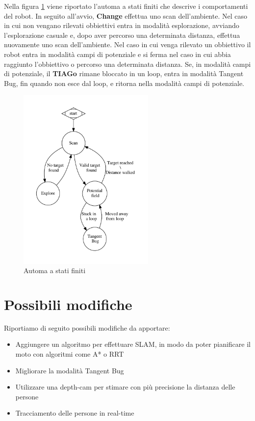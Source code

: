\documentclass[a4paper]{article}
\begin{document}
	Nella figura \ref{fig:fsa} viene riportato l'automa a stati finiti che
	descrive i comportamenti del robot. In seguito all'avvio, \textbf{Change}
	effettua uno scan dell'ambiente. Nel caso in cui non vengano rilevati
	obbiettivi entra in modalità esplorazione, avviando l'esplorazione casuale
	e, dopo aver percorso una determinata distanza, effettua nuovamente uno
	scan dell'ambiente. Nel caso in cui venga rilevato un obbiettivo il robot
	entra in modalità campi di potenziale e si ferma nel caso in cui abbia
	raggiunto l'obbiettivo o percorso una determinata distanza. Se, in modalità
	campi di potenziale, il \textbf{TIAGo} rimane bloccato in un loop, entra in
	modalità Tangent Bug, fin quando non esce dal loop, e ritorna nella
	modalità campi di potenziale.
	
	\begin{figure}[H]
		\centering
		\includegraphics[width=0.6\textwidth]{./img/fsa.pdf}
		\caption{Automa a stati finiti }
		\label{fig:fsa}
	\end{figure}
	
	\section{Possibili modifiche}\label{sec:Possibli-modifiche}
	Riportiamo di seguito possibili modifiche da apportare:
	\begin{itemize}
		\item Aggiungere un algoritmo per effettuare SLAM, in modo da poter
			pianificare il moto con algoritmi come A* \cite{A*} o RRT
			\cite{RRT}
		\item Migliorare la modalità Tangent Bug
		\item Utilizzare una depth-cam per stimare con più precisione la
			distanza delle persone
		\item Tracciamento delle persone in real-time
	\end{itemize}
\end{document}
